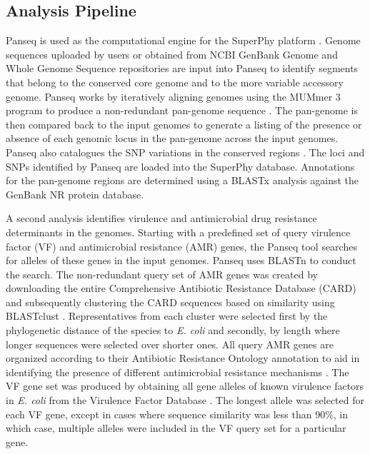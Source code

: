 \documentclass[a4paper,twoside]{article}
\begin{document}
\subsection{Analysis Pipeline}
\label{sec:pipeline}

Panseq is used as the computational engine for the SuperPhy platform \cite{laing_pan-genome_2010}. Genome sequences uploaded by users or obtained from NCBI GenBank Genome and Whole Genome Sequence repositories \cite{benson2013genbank} are input into Panseq to identify segments that belong to the conserved core genome and to the more variable accessory genome. Panseq works by iteratively aligning genomes using the MUMmer 3 program to produce a non-redundant pan-genome sequence \cite{laing_pan-genome_2010,kurtz2004versatile}. The pan-genome is then compared back to the input genomes to generate a listing of the presence or absence of each genomic locus in the pan-genome across the input genomes. Panseq also catalogues the SNP variations in the conserved regions \cite{laing_pan-genome_2010}.  The loci and SNPs identified by Panseq are loaded into the SuperPhy database. Annotations for the pan-genome regions are determined using a BLASTx analysis against the GenBank NR protein database.

A second analysis identifies virulence and antimicrobial drug resistance determinants in the genomes. Starting with a predefined set of query virulence factor (VF) and antimicrobial resistance (AMR) genes, the Panseq tool searches for alleles of these genes in the input genomes. Panseq uses BLASTn to conduct the search. The non-redundant query set of AMR genes was created by downloading the entire Comprehensive Antibiotic Resistance Database (CARD) \cite{mcarthur2012card} and subsequently clustering the CARD sequences based on similarity using BLASTclust \cite{altschul_gapped_1997}. Representatives from each cluster were selected first by the phylogenetic distance of the species to \textit{E. coli} and secondly, by length where longer sequences were selected over shorter ones. All query AMR genes are organized according to their Antibiotic Resistance Ontology annotation to aid in identifying the presence of different antimicrobial resistance mechanisms \cite{antezana_biological_2009}. The VF gene set was produced by obtaining all gene alleles of known virulence factors in \textit{E. coli} from the Virulence Factor Database \cite{chen2012vfdb,chen2005vfdb}.  The longest allele was selected for each VF gene, except in cases where sequence similarity was less than 90\%, in which case, multiple alleles were included in the VF query set for a particular gene.
\end{document}
